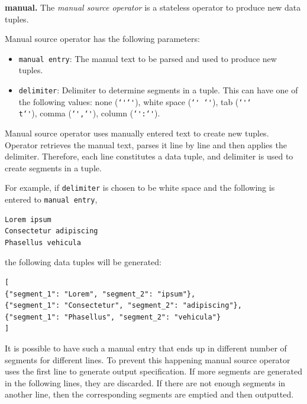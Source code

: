 
\textbf{manual.}
The \textit{manual source operator} is a stateless operator to produce new data 
tuples.

\newcommand{\ditto}{\texttt{\char`\'}}

Manual source operator has the following parameters:
\begin{itemize}
	\item \texttt{manual entry}: The manual text to be parsed and used to produce 
	new tuples.
	\item \texttt{delimiter}: Delimiter to determine segments in a tuple. This can have one 
	of the following values: none (\ditto\ditto), white space (\ditto\texttt{ }\ditto), 
	tab (\ditto\texttt{\char`\\t}\ditto), comma (\ditto\texttt{,}\ditto), 
	column (\ditto\texttt{:}\ditto).
\end{itemize}

Manual source operator uses manually entered text to create new tuples. Operator 
retrieves the manual text, parses it line by line and then applies the delimiter. 
Therefore, each line constitutes a data tuple, and delimiter is used to create segments 
in a tuple.

For example, if \texttt{delimiter} is chosen to be white space and the following is 
entered to \texttt{manual entry},

\begin{lstlisting}
Lorem ipsum
Consectetur adipiscing
Phasellus vehicula
\end{lstlisting}

\noindent the following data tuples will be generated:

\begin{lstlisting}
[
{"segment_1": "Lorem", "segment_2": "ipsum"},
{"segment_1": "Consectetur", "segment_2": "adipiscing"},
{"segment_1": "Phasellus", "segment_2": "vehicula"}
]
\end{lstlisting}

It is possible to have such a manual entry that ends up in different number of segments 
for different lines. To prevent this happening manual source operator uses the first line 
to generate output specification. If more segments are generated in the following lines, 
they are discarded. If there are not enough segments in another line, then the corresponding 
segments are emptied and then outputted.

